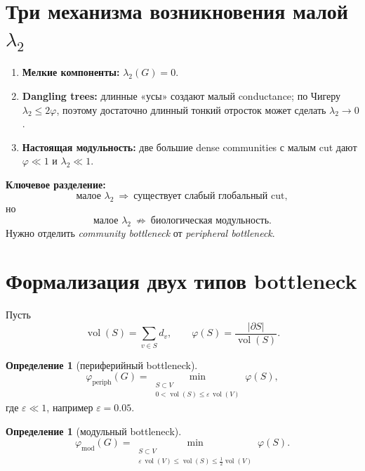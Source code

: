 \documentclass[11pt,a4paper]{article}
\theoremstyle{plain}
\theoremstyle{definition}
\newtheorem{definition}[theorem]{Определение}
\theoremstyle{remark}
\DeclareMathOperator{\vol}{vol}
\newcommand{\periph}{\mathrm{periph}}
\newcommand{\modu}{\mathrm{mod}}
\newcommand{\Ph}{\varphi}
\newcommand{\lamtwo}{\lambda_2}
\begin{document}
\section{Три механизма возникновения малой $\lamtwo$}
\label{sec:mechanisms}

\begin{enumerate}[leftmargin=*]
\item \textbf{Мелкие компоненты:} $\lamtwo(G)=0$.
\item \textbf{Dangling trees:} длинные «усы» создают малый conductance; по
Чигеру $\lamtwo\le 2\Ph$, поэтому достаточно длинный тонкий отросток может
сделать $\lamtwo\to 0$.
\item \textbf{Настоящая модульность:} две большие dense communities с малым
cut дают $\Ph\ll 1$ и $\lamtwo\ll 1$.
\end{enumerate}

\textbf{Ключевое разделение:}
\begin{equation}
\text{малое }\lamtwo\ \Longrightarrow\ \text{существует слабый глобальный cut},
\end{equation}
но
\begin{equation}
\text{малое }\lamtwo\ \not\Longrightarrow\ \text{биологическая модульность}.
\end{equation}
Нужно отделить \emph{community bottleneck} от \emph{peripheral bottleneck}.

\section{Формализация двух типов bottleneck}
\label{sec:bottleneck}

Пусть
\begin{equation}
\vol(S)=\sum_{v\in S}d_v,\qquad
\Ph(S)=\frac{|\partial S|}{\vol(S)} .
\end{equation}

\begin{definition}[периферийный bottleneck]
\begin{equation}
\Ph_{\periph}(G)=
\min_{\substack{S\subset V\\ 0<\vol(S)\le\varepsilon\,\vol(V)}}\Ph(S),
\end{equation}
где $\varepsilon\ll 1$, например $\varepsilon=0.05$.
\end{definition}

\begin{definition}[модульный bottleneck]
\begin{equation}
\Ph_{\modu}(G)=
\min_{\substack{S\subset V\\ \varepsilon\,\vol(V)\le\vol(S)\le\frac12\vol(V)}}\Ph(S).
\end{equation}
\end{definition}
\end{document}
